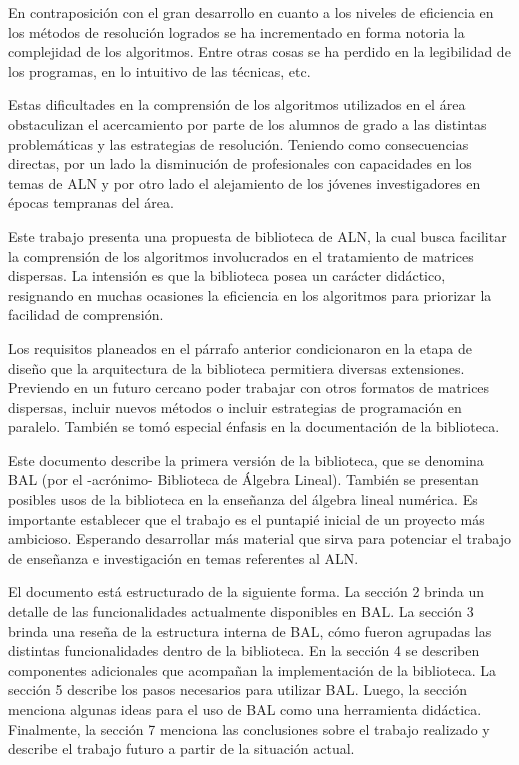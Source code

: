 \documentclass[a4paper,10pt]{article}
\begin{document}
En contraposición con el gran desarrollo en cuanto a los niveles de eficiencia en los métodos de resolución logrados se ha incrementado en forma notoria la complejidad de los algoritmos. 
Entre otras cosas se ha perdido en  la legibilidad de los programas, en lo intuitivo de las técnicas, etc.

Estas dificultades en la comprensión de los algoritmos utilizados en el área obstaculizan el acercamiento por parte de los alumnos de grado a las distintas problemáticas y las estrategias de resolución. 
Teniendo como consecuencias directas, por un lado la disminución de profesionales con capacidades en los temas de ALN y por otro lado el alejamiento de los jóvenes investigadores en épocas tempranas del área.

Este trabajo presenta una propuesta de biblioteca de ALN, la cual busca facilitar la comprensión de los algoritmos involucrados en el tratamiento de matrices dispersas.
La intensión es que la biblioteca posea un carácter didáctico, resignando en muchas ocasiones la eficiencia en los algoritmos para priorizar la facilidad de comprensión.

Los requisitos planeados en el párrafo anterior condicionaron en la etapa de diseño que la arquitectura de la biblioteca permitiera diversas extensiones.
Previendo en un futuro cercano poder trabajar con otros formatos de matrices dispersas, incluir nuevos métodos o incluir estrategias de programación en paralelo. 
También se tomó especial énfasis en la documentación de la biblioteca.

Este documento describe la primera versión de la biblioteca, que se denomina BAL (por el -acrónimo- Biblioteca de Álgebra Lineal).
También se presentan posibles usos de la biblioteca en la enseñanza del álgebra lineal numérica. 
Es importante establecer que el trabajo es el puntapié inicial de un proyecto más ambicioso. 
Esperando desarrollar más material que sirva para potenciar el trabajo de enseñanza e investigación en temas referentes al ALN.

El documento está estructurado de la siguiente forma. La sección 2 brinda un detalle de las funcionalidades actualmente disponibles en BAL. 
La sección 3 brinda una reseña de la estructura interna de BAL, cómo fueron agrupadas las distintas funcionalidades dentro de la biblioteca.
En la sección 4 se describen componentes adicionales que acompañan la implementación de la biblioteca. 
La sección 5 describe los pasos necesarios para utilizar BAL.
Luego, la sección menciona algunas ideas para el uso de BAL como una herramienta didáctica.  
Finalmente, la sección 7 menciona las conclusiones sobre el trabajo realizado y describe el trabajo futuro a partir de la situación actual.
\end{document}
